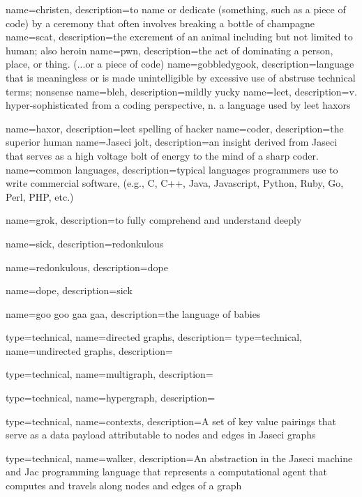 {
    name=christen,
    description={to name or dedicate (something, such as a piece of code) by a ceremony that often involves breaking a bottle of champagne}
}
{
    name=scat,
    description={the excrement of an animal including but not limited to human; also heroin }
}
{
    name=pwn,
    description={the act of dominating a person, place, or thing. (...or a piece of code)}
}
{
    name=gobbledygook,
    description={language that is meaningless or is made unintelligible by excessive use of abstruse technical terms; nonsense}
}
{
    name=bleh,
    description={mildly yucky}
}
{
    name=leet,
    description={v. hyper-sophisticated from a coding perspective, n. a language used by \gls{leet} \gls{haxor}s}
}

{
    name=haxor,
    description={\gls{leet} spelling of hacker}
}
{
    name=coder,
    description={the superior human}
}
{
    name=Jaseci jolt,
    description={an insight derived from Jaseci that serves as a high voltage bolt of energy to the mind of a sharp coder.}
}
{
    name=common languages,
    description={typical languages programmers use to write commercial software, (e.g., C, C++, Java, Javascript, Python, Ruby, Go, Perl, PHP, etc.)}
}

{
    name=grok,
    description={to fully comprehend and understand deeply }
}

{
    name=sick,
    description={\gls{redonkulous}}
}

{
    name=redonkulous,
    description={\gls{dope}}
}

{
    name=dope,
    description={\gls{sick}}
}

{
    name=goo goo gaa gaa,
    description={the language of babies}
}

{
    type=technical,
    name=directed graphs,
    description={}
}
{
    type=technical,
    name=undirected graphs,
    description={}
}

{
    type=technical,
    name=multigraph,
    description={}
}

{
    type=technical,
    name=hypergraph,
    description={}
}

{
    type=technical,
    name=contexts,
    description={A set of key value pairings that serve as a data payload attributable to nodes and edges in Jaseci graphs}
}

{
    type=technical,
    name=walker,
    description={An abstraction in the Jaseci machine and Jac programming language that represents a computational agent that computes and travels along nodes and edges of a graph}
}
